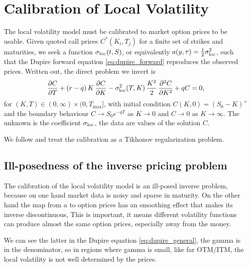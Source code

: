 
\chapter{Calibration of Local Volatility}
\label{cha:cal_local_vol}

The local volatility model must be calibrated to market option prices to be usable.
Given quoted call prices $C^*(K_i, T_j)$ for a finite set of strikes and maturities,
we seek a function $\sigma_{\mathrm{loc}}(t,S)$, or equivalently $a(y,\tau) = \tfrac{1}{2}\sigma_{\mathrm{loc}}^2$,
such that the Dupire forward equation \eqref{eq:dupire_forward} reproduces the observed prices.
Written out, the direct problem we invert is
\begin{equation*}
    \frac{\partial C}{\partial T} + (r-q)\,K\,\frac{\partial C}{\partial K}
    - \sigma_{\mathrm{loc}}^2(T,K)\,\frac{K^2}{2}\,\frac{\partial^2 C}{\partial K^2} + qC = 0,
\end{equation*}
for $(K,T) \in (0,\infty) \times (0, T_{\max}]$,
with initial condition $C(K,0) = (S_0 - K)^+$
and the boundary behaviour $C \to S_0 e^{-qT}$ as $K \to 0$ and $C \to 0$ as $K \to \infty$.
The unknown is the coefficient $\sigma_{\mathrm{loc}}$, the data are values of the solution $C$.

We follow \cite{egger2005tikhonov} and treat the calibration as a Tikhonov regularization problem.

\section{Ill-posedness of the inverse pricing problem}

The calibration of the local volatility model is an ill-posed inverse problem,
because on one hand market data is noisy and sparse in maturity.
On the other hand the map from $a$ to option prices has an smoothing effect that makes its inverse discontinuous,
This is important, it means different volatility functions can produce almost the same option prices, especially away from the money.

We can see the latter in the Dupire equation \eqref{eq:dupire_general},
the gamma is in the denominator,
so in regions where gamma is small, like far OTM/ITM,
the local volatility is not well determined by the prices.

